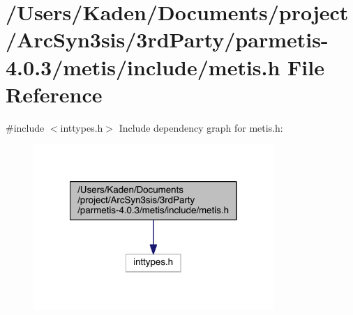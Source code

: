 \hypertarget{a00876}{}\section{/\+Users/\+Kaden/\+Documents/project/\+Arc\+Syn3sis/3rd\+Party/parmetis-\/4.0.3/metis/include/metis.h File Reference}
\label{a00876}
{\ttfamily \#include $<$inttypes.\+h$>$}\newline
Include dependency graph for metis.\+h\+:\nopagebreak
\begin{figure}[H]
\begin{center}
\leavevmode
\includegraphics[width=258pt]{a00877}
\end{center}
\end{figure}
